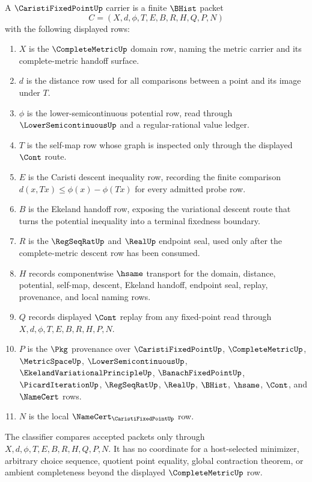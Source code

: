 \begin{definition}
\label{def:caristi-fixed-point-carrier}
A $\CaristiFixedPointUp$ carrier is a finite $\BHist$ packet
$$
C=(X,d,\phi,T,E,B,R,H,Q,P,N)
$$
with the following displayed rows:
\begin{enumerate}
\item $X$ is the $\CompleteMetricUp$ domain row, naming the metric carrier and its complete-metric handoff surface.
\item $d$ is the distance row used for all comparisons between a point and its image under $T$.
\item $\phi$ is the lower-semicontinuous potential row, read through $\LowerSemicontinuousUp$ and a regular-rational value ledger.
\item $T$ is the self-map row whose graph is inspected only through the displayed $\Cont$ route.
\item $E$ is the Caristi descent inequality row, recording the finite comparison $d(x,T x)\leq \phi(x)-\phi(Tx)$ for every admitted probe row.
\item $B$ is the Ekeland handoff row, exposing the variational descent route that turns the potential inequality into a terminal fixedness boundary.
\item $R$ is the $\RegSeqRatUp$ and $\RealUp$ endpoint seal, used only after the complete-metric descent row has been consumed.
\item $H$ records componentwise $\hsame$ transport for the domain, distance, potential, self-map, descent, Ekeland handoff, endpoint seal, replay, provenance, and local naming rows.
\item $Q$ records displayed $\Cont$ replay from any fixed-point read through $X,d,\phi,T,E,B,R,H,P,N$.
\item $P$ is the $\Pkg$ provenance over $\CaristiFixedPointUp$, $\CompleteMetricUp$, $\MetricSpaceUp$, $\LowerSemicontinuousUp$, $\EkelandVariationalPrincipleUp$, $\BanachFixedPointUp$, $\PicardIterationUp$, $\RegSeqRatUp$, $\RealUp$, $\BHist$, $\hsame$, $\Cont$, and $\NameCert$ rows.
\item $N$ is the local $\NameCert_{\CaristiFixedPointUp}$ row.
\end{enumerate}
The classifier compares accepted packets only through $X,d,\phi,T,E,B,R,H,Q,P,N$. It has no coordinate for a host-selected minimizer, arbitrary choice sequence, quotient point equality, global contraction theorem, or ambient completeness beyond the displayed $\CompleteMetricUp$ row.
\end{definition}

